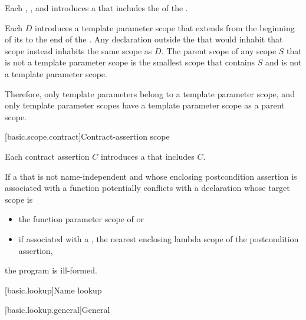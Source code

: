 \pnum
Each
,
, and
introduces
a 
that includes the  of
the .

\pnum
Each  $D$ introduces
a template parameter scope
that extends from the beginning of its 
to the end of the .
Any declaration outside the 
that would inhabit that scope instead inhabits the same scope as $D$.
The parent scope of any scope $S$ that is not a template parameter scope
is the smallest scope that contains $S$ and is not a template parameter scope.
\begin{note}
Therefore, only template parameters belong to a template parameter scope, and
only template parameter scopes have
a template parameter scope as a parent scope.
\end{note}

[basic.scope.contract]{Contract-assertion scope}%

\pnum
Each contract assertion
$C$ introduces a 
that includes $C$.

\pnum
If a 
that is not name-independent
and whose enclosing postcondition assertion
is associated with a function 
potentially conflicts with
a declaration whose target scope is
\begin{itemize}
\item
the function parameter scope of  or
\item
if associated with a ,
the nearest enclosing lambda scope
of the postcondition assertion,
\end{itemize}
the program is ill-formed.


[basic.lookup]{Name lookup}%


[basic.lookup.general]{General}%
%


